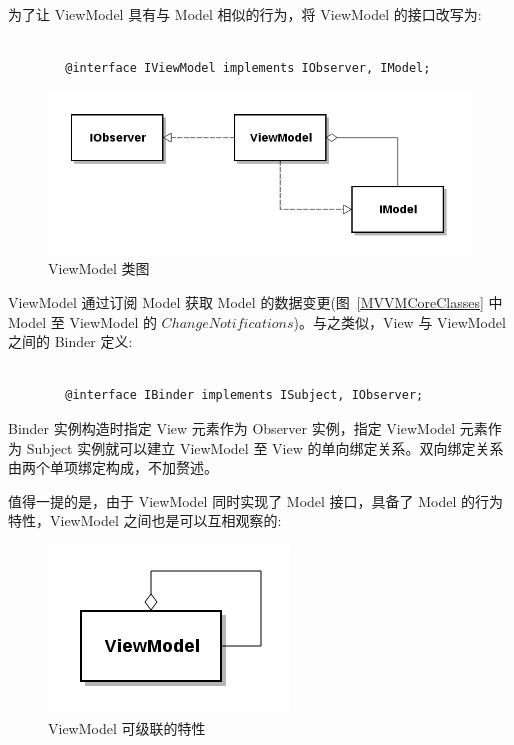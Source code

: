 为了让 ViewModel 具有与 Model 相似的行为，将 ViewModel 的接口改写为:

\begin{verbatim}

        @interface IViewModel implements IObserver, IModel;

\end{verbatim}

\begin{figure}[!h]
  \begin{center}
    \includegraphics[scale=0.5]{figures/diagram-viewmodel.png}
    \caption{ViewModel 类图\label{ViewModelClass}}
  \end{center}
\end{figure}

ViewModel 通过订阅 Model 获取 Model 的数据变更(图~\ref{MVVMCoreClasses} 中 Model 至 ViewModel 的 $Change Notifications$)。与之类似，View 与 ViewModel 之间的 Binder 定义:

\begin{verbatim}

        @interface IBinder implements ISubject, IObserver;

\end{verbatim}

Binder 实例构造时指定 View 元素作为 Observer 实例，指定 ViewModel 元素作为 Subject 实例就可以建立 ViewModel 至 View 的单向绑定关系。双向绑定关系由两个单项绑定构成，不加赘述。

值得一提的是，由于 ViewModel 同时实现了 Model 接口，具备了 Model 的行为特性，ViewModel 之间也是可以互相观察的:

\begin{figure}[!h]
  \begin{center}
    \includegraphics[scale=0.5]{figures/diagram-viewmodel-cascading.png}
    \caption{ViewModel 可级联的特性\label{ViewModelCascading}}
  \end{center}
\end{figure}

